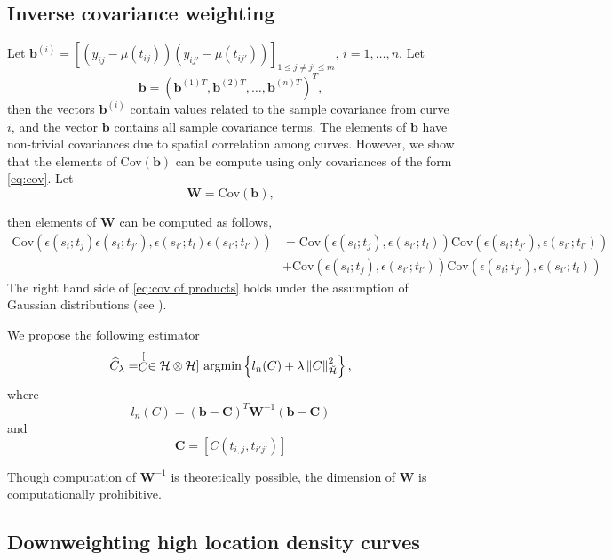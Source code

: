 \subsection{Inverse covariance weighting} \label{sec:adjustments to the covariance}

Let $\mathbf{b}^{(i)} = [(y_{ij}-\mu(t_{ij}))(y_{ij'}-\mu(t_{ij'}))]_{1\leq j\neq j'\leq m}$, $i=1, \dots, n$. Let
\[ \mathbf{b} = (\mathbf{b}^{(1)T}, \mathbf{b}^{(2)T}, \dots, \mathbf{b}^{(n)T} )^T, \]
then the vectors $\mathbf{b}^{(i)}$ contain values related to the sample covariance from curve $i$, and the vector $\mathbf{b}$ contains all sample covariance terms. The elements of $\mathbf{b}$ have non-trivial covariances due to spatial correlation among curves. However, we show that the elements of Cov$(\mathbf{b})$ can be compute using only covariances of the form \eqref{eq:cov}. Let
\[ \mathbf{W}= \text{Cov}(\mathbf{b}), \]

then elements of $\mathbf{W}$ can be computed as follows, 
\begin{align}
	\text{Cov}(\epsilon(s_i; t_{j}) \epsilon(s_i;t_{j'}), \epsilon(s_{i'}; t_{l}) \epsilon(s_{i'};t_{l'}) ) &= \text{Cov}(\epsilon(s_i; t_{j}), \epsilon(s_{i'}; t_{l}))\text{Cov}( \epsilon(s_i;t_{j'}), \epsilon(s_{i'};t_{l'}) ) \nonumber \\
	&+ \text{Cov}(\epsilon(s_i; t_{j}), \epsilon(s_{i'};t_{l'}) )\text{Cov}(\epsilon(s_i;t_{j'}), \epsilon(s_{i'}; t_{l})) \label{eq:cov of products} 
\end{align}
The right hand side of \eqref{eq:cov of products} holds under the assumption of Gaussian distributions (see \cite{Bohrnstedt:2010ud}). 

We propose the following estimator
\[ \widehat{C}_{\lambda}=\stackrel[C \in \mathcal{H}\otimes \mathcal{H}]{}{\text{ argmin}} \left\{ l_{n}(C)+\lambda\left\Vert C\right\Vert _{\breve{\mathcal{H}}}^{2} \right\}, \]
where 
\begin{equation}
	l_{n}(C)= (\mathbf{b} - \mathbf{C})^T\mathbf{W}^{-1}(\mathbf{b} - \mathbf{C}) \label{eq:weighted loss function} 
\end{equation}
and
\[ \mathbf{C} = [C(t_{i,j}, t_{i'j'})] \]

Though computation of $\mathbf{W}^{-1}$ is theoretically possible, the dimension of $\mathbf{W}$ is computationally prohibitive. 

\subsection{Downweighting high location density curves} %
\label{sub:downweighting_high_location_density_curves}

